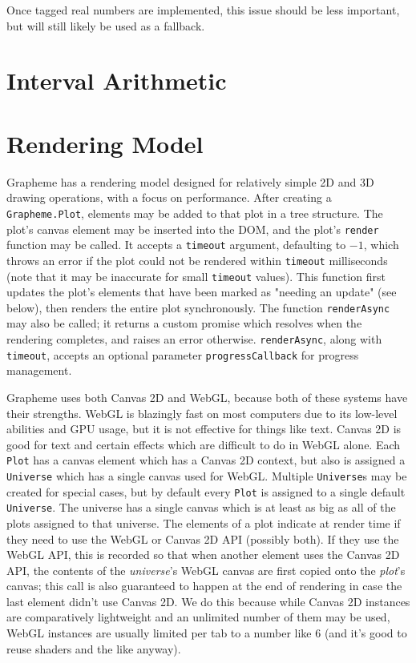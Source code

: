 \documentclass{article}
\begin{document}
Once tagged real numbers are implemented, this issue should be less important, but will still likely be used as a fallback.

\section{Interval Arithmetic}

\section{Rendering Model}

Grapheme has a rendering model designed for relatively simple 2D and 3D drawing operations, with a focus on performance. After creating a \texttt{Grapheme.Plot}, elements may be added to that plot in a tree structure. The plot's canvas element may be inserted into the DOM, and the plot's \texttt{render} function may be called. It accepts a \texttt{timeout} argument, defaulting to $-1$, which throws an error if the plot could not be rendered within \texttt{timeout} milliseconds (note that it may be inaccurate for small \texttt{timeout} values). This function first updates the plot's elements that have been marked as "needing an update" (see below), then renders the entire plot synchronously. The function \texttt{renderAsync} may also be called; it returns a custom promise which resolves when the rendering completes, and raises an error otherwise. \texttt{renderAsync}, along with \texttt{timeout}, accepts an optional parameter \texttt{progressCallback} for progress management.

Grapheme uses both Canvas 2D and WebGL, because both of these systems have their strengths. WebGL is blazingly fast on most computers due to its low-level abilities and GPU usage, but it is not effective for things like text. Canvas 2D is good for text and certain effects which are difficult to do in WebGL alone. Each \texttt{Plot} has a canvas element which has a Canvas 2D context, but also is assigned a \texttt{Universe} which has a single canvas used for WebGL. Multiple \texttt{Universe}s may be created for special cases, but by default every \texttt{Plot} is assigned to a single default \texttt{Universe}. The universe has a single canvas which is at least as
big as all of the plots assigned to that universe. The elements of a plot indicate at render time if they need to use the WebGL or Canvas 2D API (possibly both). If they use the WebGL API, this is recorded so that when another element uses the Canvas 2D API, the contents of the \textit{universe}'s WebGL canvas are first copied onto the \textit{plot}'s canvas; this call is also guaranteed to happen at the end of rendering in case the last element didn't use Canvas 2D. We do this because while Canvas 2D instances are comparatively lightweight and an unlimited number of them may be used, WebGL instances are usually limited per tab to a number like $6$ (and it's good to reuse shaders and the like anyway).
\end{document}
